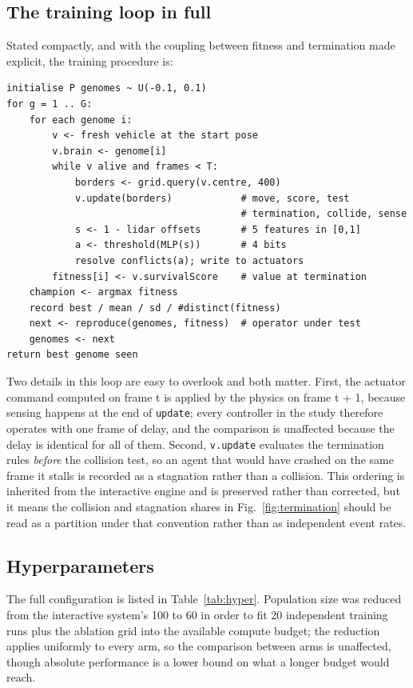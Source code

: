 \documentclass[conference]{IEEEtran}
\begin{document}
\subsection{The training loop in full}

Stated compactly, and with the coupling between fitness and termination made explicit, the training procedure is:

\begin{verbatim}
initialise P genomes ~ U(-0.1, 0.1)
for g = 1 .. G:
    for each genome i:
        v <- fresh vehicle at the start pose
        v.brain <- genome[i]
        while v alive and frames < T:
            borders <- grid.query(v.centre, 400)
            v.update(borders)            # move, score, test
                                         # termination, collide, sense
            s <- 1 - lidar offsets       # 5 features in [0,1]
            a <- threshold(MLP(s))       # 4 bits
            resolve conflicts(a); write to actuators
        fitness[i] <- v.survivalScore    # value at termination
    champion <- argmax fitness
    record best / mean / sd / #distinct(fitness)
    next <- reproduce(genomes, fitness)  # operator under test
    genomes <- next
return best genome seen
\end{verbatim}

Two details in this loop are easy to overlook and both matter. First, the actuator command computed on frame t is applied by the physics on frame t + 1, because sensing happens at the end of \texttt{update}; every controller in the study therefore operates with one frame of delay, and the comparison is unaffected because the delay is identical for all of them. Second, \texttt{v.update} evaluates the termination rules \emph{before} the collision test, so an agent that would have crashed on the same frame it stalls is recorded as a stagnation rather than a collision. This ordering is inherited from the interactive engine and is preserved rather than corrected, but it means the collision and stagnation shares in Fig.~\ref{fig:termination} should be read as a partition under that convention rather than as independent event rates.

\subsection{Hyperparameters}

The full configuration is listed in Table~\ref{tab:hyper}. Population size was reduced from the interactive system's 100 to 60 in order to fit 20 independent training runs plus the ablation grid into the available compute budget; the reduction applies uniformly to every arm, so the comparison between arms is unaffected, though absolute performance is a lower bound on what a longer budget would reach.
\end{document}
